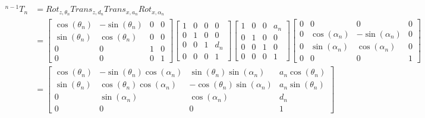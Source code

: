 \begin{equation}
    \begin{split}
        ^{n-1}T_{n} & = Rot_{z, \theta_n} Trans_{z, d_n} Trans_{x, a_n} Rot_{x, \alpha_n}                                   \\
                    & = \begin{bmatrix}
                            \cos(\theta_n) & -\sin(\theta_n) & 0 & 0 \\
                            \sin(\theta_n) & \cos(\theta_n)  & 0 & 0 \\
                            0              & 0               & 1 & 0 \\
                            0              & 0               & 0 & 1
                        \end{bmatrix}
        \begin{bmatrix}
            1 & 0 & 0 & 0   \\
            0 & 1 & 0 & 0   \\
            0 & 0 & 1 & d_n \\
            0 & 0 & 0 & 1
        \end{bmatrix}
        \begin{bmatrix}
            1 & 0 & 0 & a_n \\
            0 & 1 & 0 & 0   \\
            0 & 0 & 1 & 0   \\
            0 & 0 & 0 & 1
        \end{bmatrix}
        \begin{bmatrix}
            0 & 0              & 0               & 0 \\
            0 & \cos(\alpha_n) & -\sin(\alpha_n) & 0 \\
            0 & \sin(\alpha_n) & \cos(\alpha_n)  & 0 \\
            0 & 0              & 0               & 1
        \end{bmatrix}                                                                            \\
                    & = \begin{bmatrix}
                            \cos(\theta_n) & -\sin(\theta_n)\cos(\alpha_n) & \sin(\theta_n)\sin(\alpha_n)  & a_n \cos(\theta_n) \\
                            \sin(\theta_n) & \cos(\theta_n)\cos(\alpha_n)  & -\cos(\theta_n)\sin(\alpha_n) & a_n \sin(\theta_n) \\
                            0              & \sin(\alpha_n)                & \cos(\alpha_n)                & d_n                \\
                            0              & 0                             & 0                             & 1
                        \end{bmatrix}
    \end{split}
    \label{equation:DH Matrix}
\end{equation}

